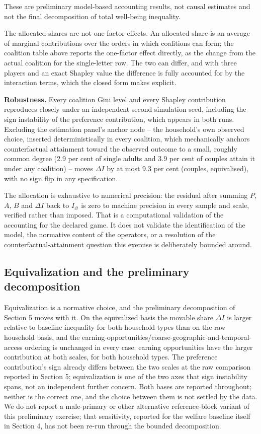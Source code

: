 \documentclass[11pt,a4paper]{article}
\begin{document}
These are preliminary model-based accounting results, not causal estimates and not the final decomposition of total well-being inequality.

The allocated shares are not one-factor effects. An allocated share is an average of marginal contributions over the orders in which coalitions can form; the coalition table above reports the one-factor effect directly, as the change from the actual coalition for the single-letter row. The two can differ, and with three players and an exact Shapley value the difference is fully accounted for by the interaction terms, which the closed form makes explicit.

\textbf{Robustness.} Every coalition Gini level and every Shapley contribution reproduces closely under an independent second simulation seed, including the sign instability of the preference contribution, which appears in both runs. Excluding the estimation panel's anchor node -- the household's own observed choice, inserted deterministically in every coalition, which mechanically anchors counterfactual attainment toward the observed outcome to a small, roughly common degree (2.9 per cent of single adults and 3.9 per cent of couples attain it under any coalition) -- moves \(\Delta I\) by at most 9.3 per cent (couples, equivalised), with no sign flip in any specification.

The allocation is exhaustive to numerical precision: the residual after summing \(P\), \(A\), \(B\) and \(\Delta I\) back to \(I_\varnothing\) is zero to machine precision in every sample and scale, verified rather than imposed. That is a computational validation of the accounting for the declared game. It does not validate the identification of the model, the normative content of the operators, or a resolution of the counterfactual-attainment question this exercise is deliberately bounded around.

\subsection{Equivalization and the preliminary decomposition}\label{equivalization-and-the-preliminary-decomposition}

Equivalization is a normative choice, and the preliminary decomposition of Section 5 moves with it. On the equivalized basis the movable share \(\Delta I\) is larger relative to baseline inequality for both household types than on the raw household basis, and the earning-opportunities/coarse-geographic-and-temporal-access ordering is unchanged in every case: earning opportunities have the larger contribution at both scales, for both household types. The preference contribution's sign already differs between the two scales at the raw comparison reported in Section 5; equivalization is one of the two axes that sign instability spans, not an independent further concern. Both bases are reported throughout; neither is the correct one, and the choice between them is not settled by the data. We do not report a male-primary or other alternative reference-block variant of this preliminary exercise; that sensitivity, reported for the welfare baseline itself in Section 4, has not been re-run through the bounded decomposition.
\end{document}
